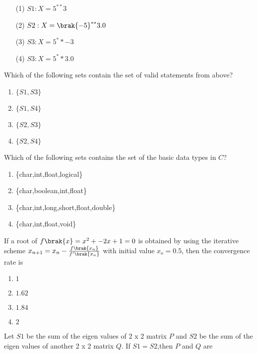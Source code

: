     \begin{enumerate}
        \item[(1)] {$S1: X=5^{**}3$}
        \item[(2)] {$S2: X=\brak{-5}^{**}3.0$}
        \item[(3)] {$S3: X=5^**-3$}
        \item[(4)] {$S3: X=5^**3.0$}
    \end{enumerate} Which of the following sets contain the set of valid statements from above?
    \begin{enumerate}
        \item $\{ S1, S3\}$
        \item $\{ S1, S4\}$
        \item $\{ S2, S3\}$
        \item $\{ S2, S4\}$
    \end{enumerate}
    \item Which of the following sets contains the set of the basic data types in $C$?
    \begin{enumerate}
        \item \{char,int,float,logical\}
        \item \{char,boolean,int,float\}
        \item \{char,int,long,short,float,double\}
        \item \{char,int,float,void\}
    \end{enumerate}
    \item If a root of $f\brak{x}=x^2+-2x+1=0$ is obtained by using the iterative scheme $x_{n+1}=x_n-\frac{f\brak{x_n}}{f'\brak{x_n}}$ with initial value $x_o=0.5$, then the convergence rate is
    \begin{enumerate}
        \item $1$
        \item $1.62$
        \item $1.84$
        \item $2$
    \end{enumerate}
    \item Let $S1$ be the sum of the eigen values of 2 x 2  matrix $P$ and $S2$ be the sum of the eigen values of another 2 x 2 matrix $Q$. If $S1=S2$,then $P$ and $Q$ are
